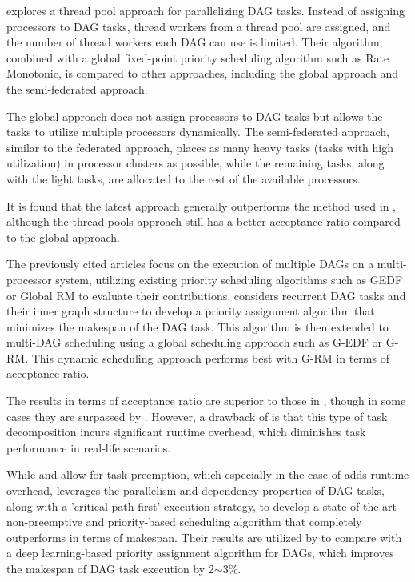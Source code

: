 \cite{SchmidResponseDAGThreadpools2021} explores a thread pool 
approach for parallelizing DAG tasks. Instead of assigning 
processors to DAG tasks, thread workers from a thread pool are 
assigned, and the number of thread workers each DAG can use is 
limited. Their algorithm, combined with a global fixed-point 
priority scheduling algorithm such as Rate Monotonic, is compared 
to other approaches, including the global approach and the 
semi-federated approach.

The global approach does not assign processors to DAG tasks but 
allows the tasks to utilize multiple processors dynamically. 
The semi-federated approach, similar to the federated approach, 
places as many heavy tasks (tasks with high utilization) in processor 
clusters as possible, while the remaining tasks, along with the 
light tasks, are allocated to the rest of the available processors.

It is found that the latest approach generally outperforms 
the method used in \cite{SchmidResponseDAGThreadpools2021}, although the 
thread pools approach still has a better acceptance ratio compared 
to the global approach.

The previously cited articles focus on the execution of multiple 
DAGs on a multi-processor system, utilizing existing priority 
scheduling algorithms such as GEDF or Global RM to evaluate their 
contributions. \cite{he2019intra} considers recurrent DAG tasks 
and their inner graph structure to develop a priority assignment 
algorithm that minimizes the makespan of the DAG task. This 
algorithm is then extended to multi-DAG scheduling using a global 
scheduling approach such as G-EDF or G-RM. This dynamic scheduling 
approach performs best with G-RM in terms of acceptance ratio.

The results in terms of acceptance ratio are superior to those in 
\cite{SchmidResponseDAGThreadpools2021}, though in some cases they 
are surpassed by \cite{CaoStretchingDAGs2020}. However, a 
drawback of \cite{CaoStretchingDAGs2020} is that this type of task 
decomposition incurs significant runtime overhead, which diminishes 
task performance in real-life scenarios.

While \cite{he2019intra} and \cite{CaoStretchingDAGs2020} allow 
for task preemption, which especially in the case of 
\cite{CaoStretchingDAGs2020} adds runtime overhead, 
\cite{zhao2020dag} leverages the parallelism and dependency 
properties of DAG tasks, along with a 'critical path first' 
execution strategy, to develop a state-of-the-art non-preemptive 
and priority-based scheduling algorithm that completely outperforms 
\cite{he2019intra} in terms of makespan. Their results are utilized 
by \cite{lee2021DAGDeeplearning} to compare with a deep 
learning-based priority assignment algorithm for DAGs, which 
improves the makespan of DAG task execution by 2$\sim$3\%.

